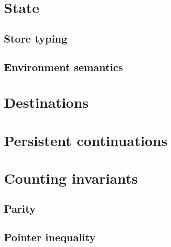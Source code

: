 \section{State}

\subsection{Store typing}


\subsection{Environment semantics}

\section{Destinations}
\label{sec:gen-destinations}


\section{Persistent continuations}

\section{Counting invariants}

\subsection{Parity}

\subsection{}

\subsection{Pointer inequality}
\label{sec:pointer-inequality}
